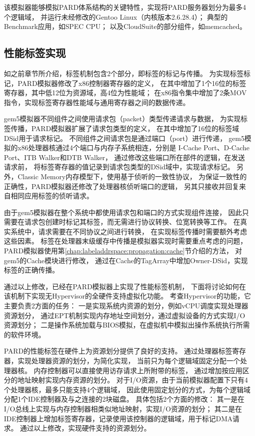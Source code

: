 该模拟器能够模拟PARD体系结构的关键特性，实现将PARD服务器划分为最多4个逻辑域，
并运行未经修改的Gentoo Linux（内核版本2.6.28.4）；
典型的Benchmark应用，如SPEC CPU\cite{cpu2006}；
以及CloudSuite\cite{Ferdman:2012:cloudsuite}的部分组件，如memcached\cite{memcached}。


\subsection{性能标签实现}
\label{chap:labeladdrspace:simimpl}

如之前章节所介绍，标签机制包含2个部分，即标签的标记与传播。
为实现标签标记，PARD模拟器修改了x86控制器寄存器的定义，
在其中增加了1个16位的标签寄存器，其中低12位为资源域，高4位为性能域；
在x86指令集中增加了2条MOV指令，实现标签寄存器性能域与通用寄存器之间的数据传递。

gem5模拟器不同组件之间使用请求包（packet）类型传递请求与数据，
为实现标签传播，PARD模拟器扩展了请求包类型的定义，
在其中增加了16位的标签域DSid用于请求标记。
不同组件之间请求包是通过端口（port）进行传递，
gem5模拟的x86处理器核通过4个端口与内存子系统相连，分别是
I-Cache Port、D-Cache Port、ITB Walker和DTB Walker，
通过修改这些端口所在部件的逻辑，在发送请求前，
将标签寄存器的值记录到请求包类型的DSid域中，实现请求标记。
另外，Classic Memory内存模型下，使用基于侦听的一致性协议，
为保证一致性的正确性，PARD模拟器还修改了处理器核侦听端口的逻辑，
另其只接收并回复来自相同应用标签的侦听请求。

由于gem5模拟器在整个系统中都使用请求包和端口的方式实现组件连接，
因此只需要在请求包创建时标记其标签，而无需进行协议转换、位宽转换等工作。
在真实系统中，请求需要在不同协议之间进行转换，
在实现标签传播时需要额外考虑这些因素。
标签在处理器末级缓存中传播是模拟器实现时需要重点考虑的问题，
PARD模拟器使用第\ref{chap:labeladdrspace:propagation:cache}节介绍的方法，
对gem5的Cache模块进行修改，
通过在Cache的TagArray中增加Owner-DSid，实现标签的正确传播。


通过以上修改，已经在PARD模拟器上实现了性能标签机制，
下面将讨论如何在该机制下实现无Hypervisor的全硬件支持虚拟化功能。
考查Hypervisor的功能，它主要负责2方面的任务：
一是实现系统内资源的划分，例如vCPU调度实现处理器资源划分，
通过EPT机制实现内存地址空间划分，通过虚拟设备的方式实现I/O资源划分；
二是操作系统加载与BIOS模拟，在虚拟机中模拟出操作系统执行所需的软件环境。

PARD的性能标签在硬件上为资源划分提供了良好的支持。
通过处理器标签寄存器，实现处理器资源的划分，为简化实现，
当前只为每个逻辑域固定分配一个处理器核。
内存控制器可以直接使用访存请求上所附带的标签，
通过增加按应用区分的地址映射实现内存资源的划分。
对于I/O资源，由于当前模拟器配置下只有4个处理器核，最多只能支持4个逻辑域，
因此使用固定划分的方式，为每个逻辑域分配1个IDE控制器及与之连接的2块磁盘。
具体包括2个方面的修改：
其一是在I/O总线上实现与内存控制器相类似地址映射，实现I/O资源的划分；
其二是在IDE控制器上增加标签寄存器，记录使用该控制器的逻辑域，用于标记DMA请求。
通过以上修改，实现硬件支持的资源划分。

